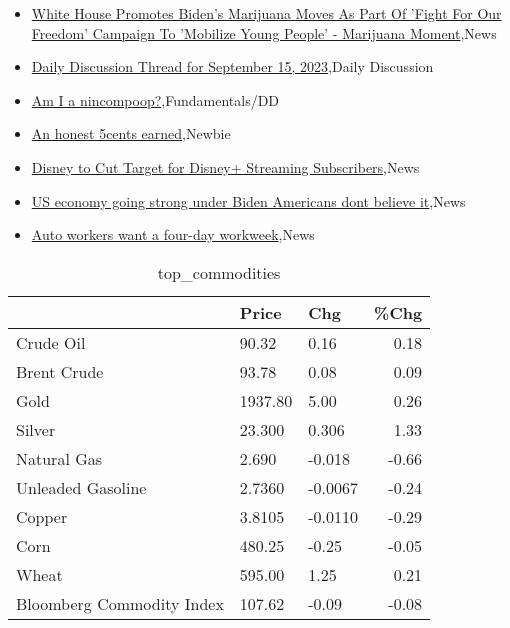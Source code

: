\documentclass{article}%
\begin{document}
%
\begin{itemize}%
\item%
\href{https://reddit.com/r/wallstreetbets/comments/16j996u/white\_house\_promotes\_bidens\_marijuana\_moves\_as/}{White House Promotes Biden's Marijuana Moves As Part Of 'Fight For Our Freedom' Campaign To 'Mobilize Young People' - Marijuana Moment},News%
\item%
\href{https://reddit.com/r/wallstreetbets/comments/16j9407/daily\_discussion\_thread\_for\_september\_15\_2023/}{Daily Discussion Thread for September 15, 2023},Daily Discussion%
\item%
\href{https://reddit.com/r/StockMarket/comments/16j6z9v/am\_i\_a\_nincompoop/}{Am I a nincompoop?},Fundamentals/DD%
\item%
\href{https://reddit.com/r/StockMarket/comments/16j0k6f/an\_honest\_5cents\_earned/}{An honest 5cents earned},Newbie%
\item%
\href{https://reddit.com/r/StockMarket/comments/16isio0/disney\_to\_cut\_target\_for\_disney\_streaming/}{Disney to Cut Target for Disney+ Streaming Subscribers},News%
\item%
\href{https://reddit.com/r/Economics/comments/16jb5h2/us\_economy\_going\_strong\_under\_biden\_americans/}{US economy going strong under Biden  Americans dont believe it},News%
\item%
\href{https://reddit.com/r/Economics/comments/16iye8p/auto\_workers\_want\_a\_fourday\_workweek/}{Auto workers want a four-day workweek},News%
\end{itemize}%


\begin{table}[htbp]%
\caption{top\_commodities}%
\centering%
\begin{adjustbox}{width=1\textwidth}%
\begin{tabular}{lllr}
\toprule
                          &   Price &     Chg &  \%Chg \\
\midrule
               Crude Oil  &   90.32 &    0.16 &  0.18 \\
             Brent Crude  &   93.78 &    0.08 &  0.09 \\
                    Gold  & 1937.80 &    5.00 &  0.26 \\
                  Silver  &  23.300 &   0.306 &  1.33 \\
             Natural Gas  &   2.690 &  -0.018 & -0.66 \\
       Unleaded Gasoline  &  2.7360 & -0.0067 & -0.24 \\
                  Copper  &  3.8105 & -0.0110 & -0.29 \\
                    Corn  &  480.25 &   -0.25 & -0.05 \\
                   Wheat  &  595.00 &    1.25 &  0.21 \\
Bloomberg Commodity Index &  107.62 &   -0.09 & -0.08 \\
\bottomrule
\end{tabular}
%
\end{adjustbox}%
\end{table}
\end{document}
